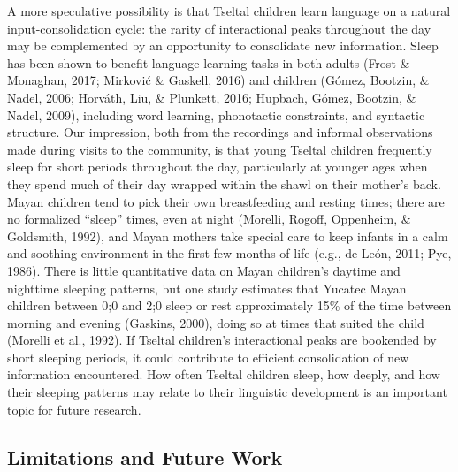 \documentclass[,man,floatsintext]{apa6}
\begin{document}
A more speculative possibility is that Tseltal children learn language
on a natural input-consolidation cycle: the rarity of interactional
peaks throughout the day may be complemented by an opportunity to
consolidate new information. Sleep has been shown to benefit language
learning tasks in both adults (Frost \& Monaghan, 2017; Mirković \&
Gaskell, 2016) and children (Gómez, Bootzin, \& Nadel, 2006; Horváth,
Liu, \& Plunkett, 2016; Hupbach, Gómez, Bootzin, \& Nadel, 2009),
including word learning, phonotactic constraints, and syntactic
structure. Our impression, both from the recordings and informal
observations made during visits to the community, is that young Tseltal
children frequently sleep for short periods throughout the day,
particularly at younger ages when they spend much of their day wrapped
within the shawl on their mother's back. Mayan children tend to pick
their own breastfeeding and resting times; there are no formalized
\enquote{sleep} times, even at night (Morelli, Rogoff, Oppenheim, \&
Goldsmith, 1992), and Mayan mothers take special care to keep infants in
a calm and soothing environment in the first few months of life (e.g.,
de León, 2011; Pye, 1986). There is little quantitative data on Mayan
children's daytime and nighttime sleeping patterns, but one study
estimates that Yucatec Mayan children between 0;0 and 2;0 sleep or rest
approximately 15\% of the time between morning and evening (Gaskins,
2000), doing so at times that suited the child (Morelli et al., 1992).
If Tseltal children's interactional peaks are bookended by short
sleeping periods, it could contribute to efficient consolidation of new
information encountered. How often Tseltal children sleep, how deeply,
and how their sleeping patterns may relate to their linguistic
development is an important topic for future research.

\subsection{Limitations and Future Work}\label{disc-limfut}
\end{document}

